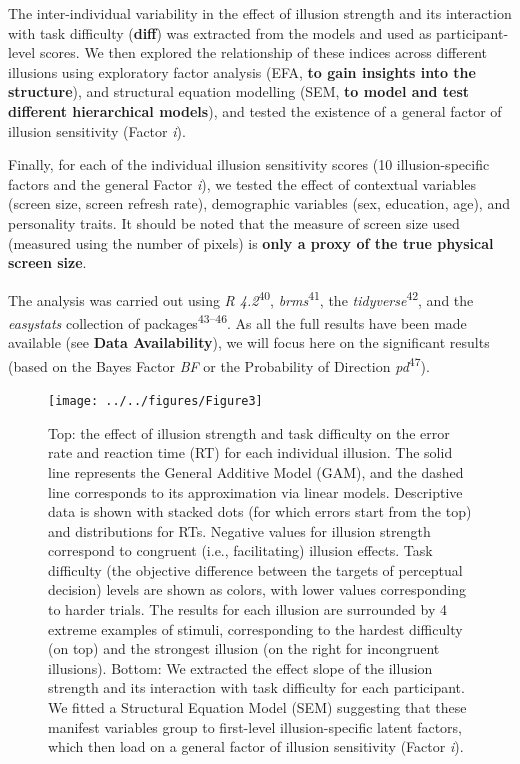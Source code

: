 \documentclass[
  man,floatsintext]{apa6}
\begin{document}
The inter-individual variability in the effect of illusion strength and its interaction with task difficulty (\textbf{diff}) was extracted from the models and used as participant-level scores. We then explored the relationship of these indices across different illusions using exploratory factor analysis (EFA, \textbf{to gain insights into the structure}), and structural equation modelling (SEM, \textbf{to model and test different hierarchical models}), and tested the existence of a general factor of illusion sensitivity (Factor \emph{i}).

Finally, for each of the individual illusion sensitivity scores (10 illusion-specific factors and the general Factor \emph{i}), we tested the effect of contextual variables (screen size, screen refresh rate), demographic variables (sex, education, age), and personality traits. It should be noted that the measure of screen size used (measured using the number of pixels) is \textbf{only a proxy of the true physical screen size}.

The analysis was carried out using \emph{R 4.2}\textsuperscript{40}, \emph{brms}\textsuperscript{41}, the \emph{tidyverse}\textsuperscript{42}, and the \emph{easystats} collection of packages\textsuperscript{43--46}. As all the full results have been made available (see \textbf{Data Availability}), we will focus here on the significant results
(based on the Bayes Factor \emph{BF} or the Probability of Direction \emph{pd}\textsuperscript{47}).

\begin{figure}
\texttt{[image: ../../figures/Figure3]} \caption{Top: the effect of illusion strength and task difficulty on the error rate and reaction time (RT) for each individual illusion. The solid line represents the General Additive Model (GAM), and the dashed line corresponds to its approximation via linear models. Descriptive data is shown with stacked dots (for which errors start from the top) and distributions for RTs. Negative values for illusion strength correspond to congruent (i.e., facilitating) illusion effects. Task difficulty (the objective difference between the targets of perceptual decision) levels are shown as colors, with lower values corresponding to harder trials. The results for each illusion are surrounded by 4 extreme examples of stimuli, corresponding to the hardest difficulty (on top) and the strongest illusion (on the right for incongruent illusions). Bottom: We extracted the effect slope of the illusion strength and its interaction with task difficulty for each participant. We fitted a Structural Equation Model (SEM) suggesting that these manifest variables group to first-level illusion-specific latent factors, which then load on a general factor of illusion sensitivity (Factor \textit{i}).}\label{fig:unnamed-chunk-4}
\end{figure}
\end{document}

